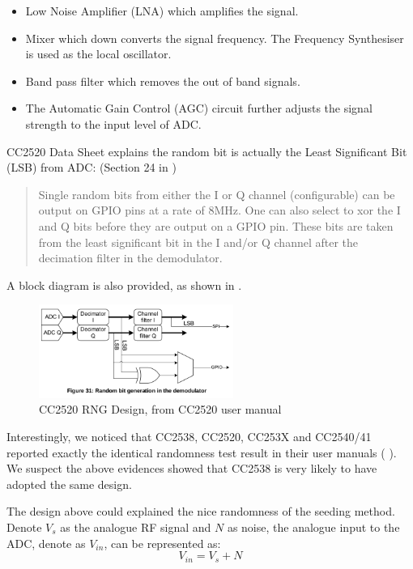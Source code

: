 \begin{itemize}
	\item Low Noise Amplifier (LNA) which amplifies the signal.
	\item Mixer which down converts the signal frequency. The Frequency Synthesiser is used as the local oscillator.
	\item Band pass filter which removes the out of band signals.
	\item The Automatic Gain Control (AGC) circuit further adjusts the signal strength to the input level of ADC.
\end{itemize}

CC2520 Data Sheet\cite{CC2520Manual} explains the random bit is actually the Least Significant Bit (LSB) from ADC: (Section 24 in \cite{CC2520Manual})
\begin{quote}
Single random bits from either the I or Q channel (configurable) can be output on GPIO pins at a rate of 8MHz. One can also select to xor the I and Q bits before they are output on a GPIO pin. These bits are taken from the least significant bit in the I and/or Q channel after the decimation filter in the demodulator.
\end{quote}

A block diagram is also provided, as shown in .
\begin{figure}[!t]
\centering
\includegraphics[width=2.5in]{fig/CC2520_RNG.png}
\caption{CC2520 RNG Design, from CC2520 user manual\cite{CC2520Manual}}
\label{CC2520RFRND}
\end{figure}

Interestingly, we noticed that CC2538, CC2520, CC253X and CC2540/41 reported exactly the identical randomness test result in their user manuals (\cite{CC2538Manual} \cite{ CC2520Manual} \cite{CC2530Manual}). We suspect the above evidences showed that CC2538 is very likely to have adopted the same design.

The design above could explained the nice randomness of the seeding method. Denote $V_s$ as the analogue RF signal and $N$ as noise, the analogue input to the ADC, denote as  $V_{in}$, can be represented as:
\begin{equation} \label{V_in}
V_{in} = V_s + N
\end{equation}

